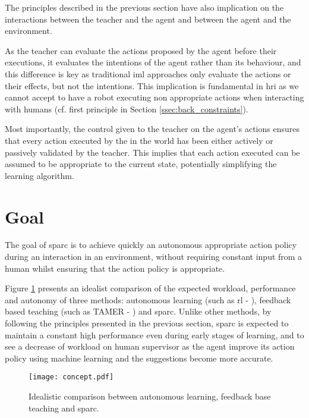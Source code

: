 The principles described in the previous section have also implication on the interactions between the teacher and the agent and between the agent and the environment.

As the teacher can evaluate the actions proposed by the agent before their executions, it evaluates the intentions of the agent rather than its behaviour, and this difference is key as traditional \gls{iml} approaches only evaluate the actions or their effects, but not the intentions. This implication is fundamental in \gls{hri} as we cannot accept to have a robot executing non appropriate actions when interacting with humans (cf. first principle in Section \ref{ssec:back_constraints}).

Most importantly, the control given to the teacher on the agent's actions ensures that every action executed by the in the world has been either actively or passively validated by the teacher. This implies that each action executed can be assumed to be appropriate to the current state, potentially simplifying the learning algorithm.

\section{Goal}

The goal of \gls{sparc} is to achieve quickly an autonomous appropriate action policy during an interaction in an environment, without requiring constant input from a human whilst ensuring that the action policy is appropriate. 

Figure \ref{fig:concept} presents an idealist comparison of the expected workload, performance and autonomy of three methods: autonomous learning (such as \gls{rl} - \citealt{sutton1998reinforcement}), feedback based teaching (such as TAMER - \citealt{knox2009interactively}) and \gls{sparc}. Unlike other methods, by following the principles presented in the previous section, \gls{sparc} is expected to maintain a constant high performance even during early stages of learning, and to see a decrease of workload on human supervisor as the agent improve its action policy using machine learning and the suggestions become more accurate.

\begin{figure}[ht]
	\texttt{[image: concept.pdf]}
	\centering
	\caption{Idealistic comparison between autonomous learning, feedback base teaching and \gls{sparc}.}
	\label{fig:concept}
\end{figure}

